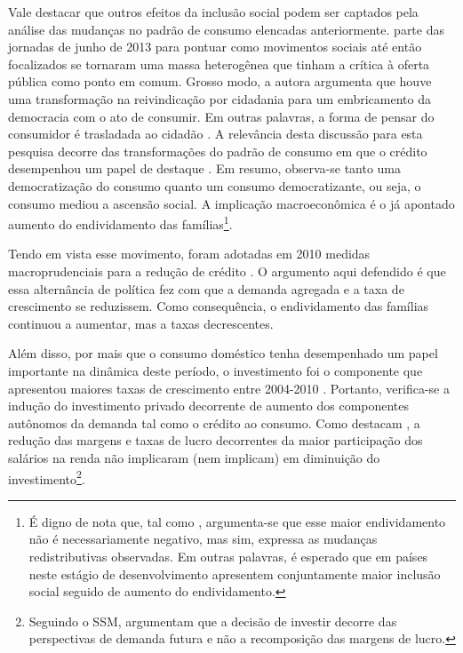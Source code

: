 Vale destacar que outros efeitos da inclusão social podem ser captados pela análise das mudanças no padrão de consumo elencadas anteriormente. \textcite{fontenelle_alcances_2016} parte das jornadas de junho de 2013 para pontuar como movimentos sociais até então focalizados se tornaram uma massa heterogênea que tinham a crítica à oferta pública como ponto em comum. Grosso modo, a autora argumenta que houve uma transformação na reivindicação por cidadania para um embricamento da democracia com o ato de consumir. Em outras palavras, a forma de pensar do consumidor é trasladada ao cidadão \cite{streeck_citizens_2012}. 
A relevância desta discussão para esta pesquisa decorre das transformações do padrão de consumo em que o crédito desempenhou um papel de destaque \cite{schettini_novas_2011}. Em resumo, observa-se tanto uma democratização do consumo quanto um consumo democratizante, ou seja, o consumo mediou a ascensão social. A implicação macroeconômica é o já apontado aumento do endividamento das famílias\footnote{É digno de nota que, tal como \textcite{dos_santos_notas_2013}, argumenta-se que esse maior endividamento não é necessariamente negativo, mas sim, expressa as mudanças redistributivas observadas. Em outras palavras, é esperado que em países neste estágio de desenvolvimento apresentem conjuntamente maior inclusão social seguido de aumento do endividamento.}. 
 
Tendo em vista esse movimento, foram adotadas em 2010 medidas macroprudenciais para a redução de crédito \cite{ribeiro_o_2016}. O argumento aqui defendido é que essa alternância de política fez com que a demanda agregada e a taxa de crescimento se reduzissem. Como consequência, o endividamento das famílias continuou a aumentar, mas a taxas decrescentes.




Além disso, por mais que o consumo doméstico tenha desempenhado um papel importante na dinâmica deste período, o investimento foi o componente que apresentou maiores taxas de crescimento entre 2004-2010 \cite{dos_santos_notas_2013}. Portanto, verifica-se a indução do investimento privado decorrente de aumento dos componentes autônomos da demanda tal como o crédito ao consumo.
Como destacam \textcite{serrano_conflito_2018}, a redução das margens e taxas de lucro decorrentes da maior participação dos salários na renda não implicaram (nem implicam) em diminuição do investimento\footnote{Seguindo o SSM, argumentam que a decisão de investir decorre das perspectivas de demanda futura e não a recomposição das margens de lucro.}. 

